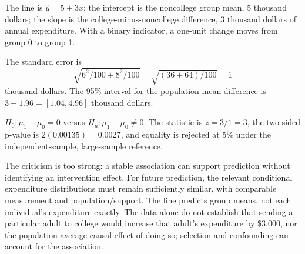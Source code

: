 \documentclass[11pt]{article}
\begin{document}
\begin{parts}
\item The line is $\widehat y=5+3x$: the intercept is the noncollege group mean, 5 thousand dollars; the slope is the college-minus-noncollege difference, 3 thousand dollars of annual expenditure. With a binary indicator, a one-unit change moves from group 0 to group 1.
\item The standard error is
\[
\sqrt{6^2/100+8^2/100}=\sqrt{(36+64)/100}=1
\]
thousand dollars. The 95\% interval for the population mean difference is $3\pm1.96=[1.04,4.96]$ thousand dollars.
\item $H_0:\mu_1-\mu_0=0$ versus $H_a:\mu_1-\mu_0\ne0$. The statistic is $z=3/1=3$, the two-sided p-value is $2(0.00135)=0.0027$, and equality is rejected at 5\% under the independent-sample, large-sample reference.
\item The criticism is too strong: a stable association can support prediction without identifying an intervention effect. For future prediction, the relevant conditional expenditure distributions must remain sufficiently similar, with comparable measurement and population/support. The line predicts group means, not each individual's expenditure exactly. The data alone do not establish that sending a particular adult to college would increase that adult's expenditure by \$3,000, nor the population average causal effect of doing so; selection and confounding can account for the association.
\end{parts}
\end{document}
